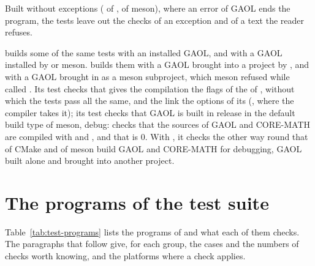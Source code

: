 \begin{Rem}
Built without exceptions ( of ,
 of meson), where an error of GAOL ends the
program, the tests leave out the checks of an exception and of a text the
reader refuses.\newinvfive
\end{Rem}

\medskip
{} builds some of the same tests with an installed
GAOL, and  with a GAOL installed by
 or meson.  builds them with a GAOL
brought into a project by , and
 with a GAOL brought in as a meson
subproject,\newinvfive{} which meson refused while  called . Its test  checks
that  gives the compilation the flags of the  of
, without which the tests pass all the same, and the link the
options of its  (, where the compiler takes
it); its test  checks that GAOL is built in release in the
default build type of meson, debug:  checks
that the sources of GAOL and CORE-MATH are compiled with  and
, and that  is 0. With ,
it checks the other way round that  of CMake and
 of meson build GAOL and CORE-MATH for debugging, GAOL
built alone and brought into another project.

\section{The programs of the test suite}\label{sec:test-programs}
%

Table~\ref{tab:test-programs} lists the programs of  and what
each of them checks. The paragraphs that follow give, for each group, the
cases and the numbers of checks worth knowing, and the platforms where a
check applies.

